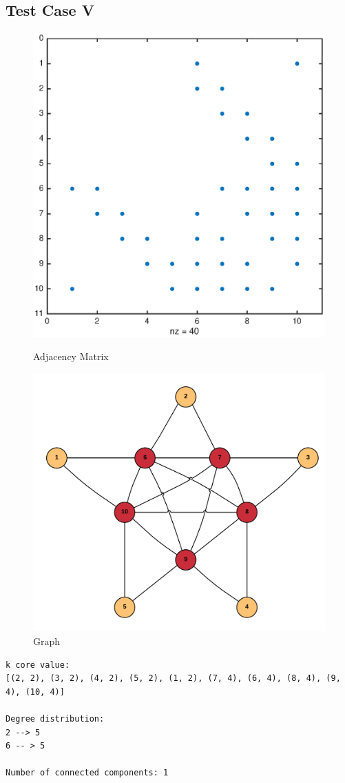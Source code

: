 \subsection{Test Case V}
\begin{figure}[H]
  \includegraphics[width=\linewidth]{spy5.eps}
  \caption{Adjacency Matrix}
\endminipage\hfill
{}
  \includegraphics[width=\linewidth]{graph5}
  \caption{Graph}
\endminipage
\end{figure}

\begin{verbatim}
k core value:
[(2, 2), (3, 2), (4, 2), (5, 2), (1, 2), (7, 4), (6, 4), (8, 4), (9, 4), (10, 4)]

Degree distribution:
2 --> 5
6 -- > 5

Number of connected components: 1
\end{verbatim}